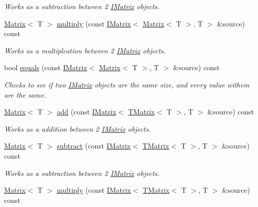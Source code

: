 \begin{DoxyCompactItemize}
\begin{DoxyCompactList}\small\item\em Works as a subtraction between 2 \mbox{\hyperlink{class_i_matrix}{I\+Matrix}} objects. \end{DoxyCompactList}\item 
\mbox{\hyperlink{class_matrix}{Matrix}}$<$ T $>$ \mbox{\hyperlink{class_t_matrix_a8cbfc5564a98f17727ac3fcf2ae60353}{multiply}} (const \mbox{\hyperlink{class_i_matrix}{I\+Matrix}}$<$ \mbox{\hyperlink{class_matrix}{Matrix}}$<$ T $>$, T $>$ \&source) const
\begin{DoxyCompactList}\small\item\em Works as a multiplcation between 2 \mbox{\hyperlink{class_i_matrix}{I\+Matrix}} objects. \end{DoxyCompactList}\item 
bool \mbox{\hyperlink{class_t_matrix_acdc681004db638f284a417a82e114f0f}{equals}} (const \mbox{\hyperlink{class_i_matrix}{I\+Matrix}}$<$ \mbox{\hyperlink{class_matrix}{Matrix}}$<$ T $>$, T $>$ \&source) const
\begin{DoxyCompactList}\small\item\em Checks to see if two \mbox{\hyperlink{class_i_matrix}{I\+Matrix}} objects are the same size, and every value withem are the same. \end{DoxyCompactList}\item 
\mbox{\hyperlink{class_matrix}{Matrix}}$<$ T $>$ \mbox{\hyperlink{class_t_matrix_a244754d9ce3532e62cead25de6890533}{add}} (const \mbox{\hyperlink{class_i_matrix}{I\+Matrix}}$<$ \mbox{\hyperlink{class_t_matrix}{T\+Matrix}}$<$ T $>$, T $>$ \&source) const
\begin{DoxyCompactList}\small\item\em Works as a addition between 2 \mbox{\hyperlink{class_i_matrix}{I\+Matrix}} objects. \end{DoxyCompactList}\item 
\mbox{\hyperlink{class_matrix}{Matrix}}$<$ T $>$ \mbox{\hyperlink{class_t_matrix_a2208a6ce98de3552f4ddf749464e5c81}{subtract}} (const \mbox{\hyperlink{class_i_matrix}{I\+Matrix}}$<$ \mbox{\hyperlink{class_t_matrix}{T\+Matrix}}$<$ T $>$, T $>$ \&source) const
\begin{DoxyCompactList}\small\item\em Works as a subtraction between 2 \mbox{\hyperlink{class_i_matrix}{I\+Matrix}} objects. \end{DoxyCompactList}\item 
\mbox{\hyperlink{class_matrix}{Matrix}}$<$ T $>$ \mbox{\hyperlink{class_t_matrix_aeabaac0c1812fabb7fbae685a475cd8e}{multiply}} (const \mbox{\hyperlink{class_i_matrix}{I\+Matrix}}$<$ \mbox{\hyperlink{class_t_matrix}{T\+Matrix}}$<$ T $>$, T $>$ \&source) const

\end{DoxyCompactItemize}
